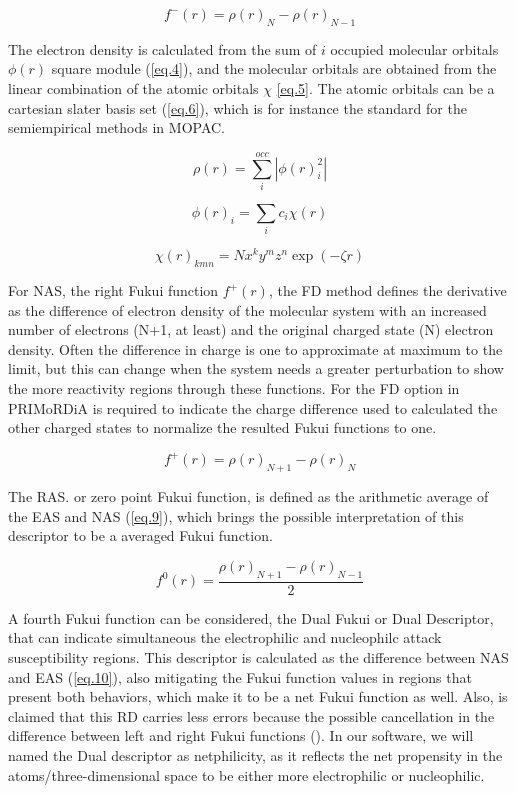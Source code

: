 \documentclass[a4paper,11pt]{refart}
\begin{document}
\begin{equation}
f^{-}(r) = \rho(r)_{N} -\rho(r)_{N-1}
\label{eq.3}
\end{equation}

The electron density is calculated from the sum of $i$ occupied molecular orbitals $\phi(r)$ square module (\autoref{eq.4}), and the molecular orbitals are obtained from the linear combination of the atomic orbitals $\chi$ \autoref{eq.5}. The atomic orbitals can be a cartesian slater basis set (\autoref{eq.6}), which is for instance the standard for the semiempirical methods in MOPAC.  

\begin{equation}
\rho(r) = \sum_{i}^{occ} |\phi(r)^2_i|
\label{eq.4} 
\end{equation}

\begin{equation}
\phi(r)_i = \sum_{i} c_i \chi(r)
\label{eq.5} 
\end{equation}

\begin{equation}
\chi(r)_{kmn} = Nx^k y^m z^n \exp(- \zeta r)
\label{eq.6} 
\end{equation}

For NAS, the right Fukui function $f^{+}(r)$, the FD method defines the derivative as the difference of electron density of the molecular system with an increased number of electrons (N+1, at least) and the original charged state (N) electron density. Often the difference in charge is one to approximate at maximum to the limit, but this can change when the system needs a greater perturbation to show the more reactivity regions through these functions. For the FD option in PRIMoRDiA is required to indicate the charge difference used to calculated the other charged states to normalize the resulted Fukui functions to one.  

\begin{equation}
f^{+}(r) = \rho(r)_{N+1} -\rho(r)_{N}
\label{eq.8}
\end{equation}

The RAS. or zero point Fukui function, is defined as the arithmetic average of the EAS and NAS (\autoref{eq.9}), which brings the possible interpretation of this descriptor to be a averaged Fukui function. 

\begin{equation}
f^{0}(r) = \frac{\rho(r)_{N+1} -\rho (r)_{N-1}}{2}
\label{eq.9}
\end{equation}

A fourth Fukui function can be considered, the Dual Fukui or Dual Descriptor, that can indicate simultaneous the electrophilic and nucleophilc attack susceptibility regions. This descriptor is calculated as the difference between NAS and EAS (\autoref{eq.10}), also mitigating the Fukui function values in regions that present both behaviors, which make it to be a net Fukui function as well. Also, is claimed that this RD carries less errors because the possible cancellation in the difference between left and right Fukui functions  (\cite{martinez2015dual}). In our software, we will named the Dual descriptor as netphilicity, as it reflects the net propensity in the atoms/three-dimensional space to be either more electrophilic or nucleophilic.
\end{document}
